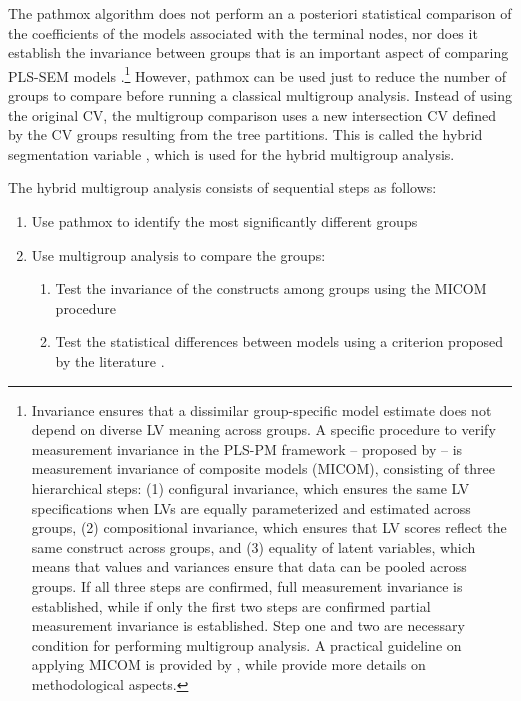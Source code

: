 The pathmox algorithm does not perform an a posteriori statistical comparison of the coefficients of the models associated with the terminal nodes, nor does it establish the invariance between groups that is an important aspect of comparing PLS-SEM models \citep{Henseler16}.\footnote{Invariance ensures that a dissimilar group-specific model estimate does not depend on diverse LV meaning across groups. A specific procedure to verify measurement invariance in the PLS-PM framework – proposed by \citet{Henseler16} – is measurement invariance of composite models (MICOM), consisting of three hierarchical steps: (1) configural invariance, which ensures the same LV specifications when LVs are equally parameterized and estimated across groups, (2) compositional invariance, which ensures that LV scores reflect the same construct across groups, and (3) equality of latent variables, which means that values and variances ensure that data can be pooled across groups. If all three steps are confirmed, full measurement invariance is established, while if only the first two steps are confirmed partial measurement invariance is established. Step one and two are necessary condition for performing multigroup analysis. A practical guideline on applying MICOM  is provided by \citep{Hair17}, while \citet{Henseler16} provide more details on methodological aspects.} However, pathmox can be used just to reduce the number of groups to compare before running a classical multigroup analysis. Instead of using the original CV, the multigroup comparison uses a new intersection CV defined by the CV groups resulting from the tree partitions. This is called the hybrid segmentation variable \citep{Lamberti21}, which is used for the hybrid multigroup analysis.  

The hybrid multigroup analysis consists of sequential steps as follows:

\begin{enumerate}
\item Use pathmox to identify the most significantly different groups
\item Use multigroup analysis to compare the groups:
\begin{enumerate}
\item Test the invariance of the constructs among groups using the MICOM procedure \citep{Henseler16}
\item Test the statistical differences between models using a criterion proposed by the literature \citep{Klesel22}.
\end{enumerate}
\end{enumerate}

